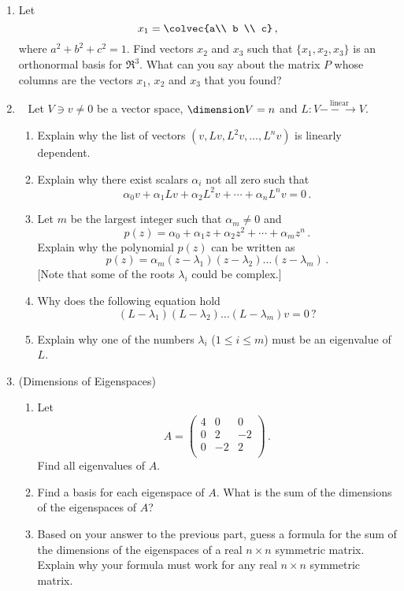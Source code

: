 \begin{enumerate}


\item Let \[x_1=\colvec{a\\ b \\ c}\, ,\] where $a^2+b^2+c^2=1$.  Find vectors $x_2$ and $x_3$ such that $\{x_1,x_2,x_3\}$ is an orthonormal basis for $\Re^3$. What can you say about the matrix $P$ whose columns are the vectors $x_1$, $x_2$ and $x_3$ that you found?

\item~\label{atleastone} Let $V\ni v\neq0$ be a vector space, $\dimension V=n$ and $L:V\stackrel{\textrm{linear}}{-\!\!-\!\!\!\longrightarrow}V$.
\begin{enumerate}
\item Explain why the list of vectors $(v,Lv,L^2v,\ldots,L^n v)$ is linearly dependent.
\item Explain why there exist scalars $\alpha_i$ not all zero such that
\[
\alpha_0 v + \alpha_1 L v+\alpha_2 L^2 v+\cdots + \alpha_n L^n v=0\, .
\]
\item Let $m$ be the largest integer such that $\alpha_m\neq0$ and \[p(z)=\alpha_0+ \alpha_1 z + \alpha_2 z^2+\cdots + \alpha_m z^n \, .\]
Explain why the polynomial $p(z)$ can be written as
\[
p(z)=\alpha_m (z-\lambda_1)(z-\lambda_2)\ldots(z-\lambda_{m})\, .
\]
[Note that some of the roots $\lambda_i$ could be complex.]
\item Why does the following equation hold
\[
(L-\lambda_1)(L-\lambda_2)\ldots(L-\lambda_{m})
 v=0\, ?
\]
\item Explain why one of the numbers $\lambda_i$ ($1\leq i\leq m$) must be an eigenvalue of $L$.
\end{enumerate}




\item (Dimensions of Eigenspaces) \begin{enumerate}
\item Let \[A=
\begin{pmatrix}
4 & 0 & 0 \\
0 & 2 & -2 \\
0 & -2 & 2 \\
\end{pmatrix}\, .\]
Find all eigenvalues of \(A.\)
\item Find a basis for each eigenspace of \(A.\)  What is the sum of the dimensions of the eigenspaces of \(A\)?
\item Based on your answer to the previous part, guess a formula for the sum of the dimensions of the eigenspaces of a real \(n \times n\) symmetric matrix. Explain why your formula must work for any real \(n \times n\) symmetric matrix.
\end{enumerate}





\end{enumerate}
